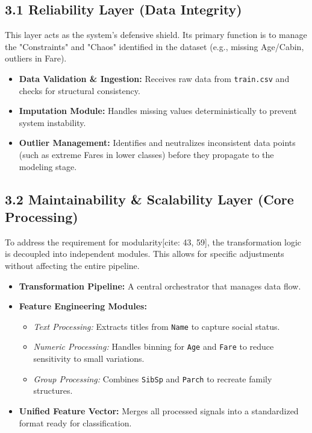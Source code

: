 \documentclass[12pt]{report}
\begin{document}
\subsection*{3.1 Reliability Layer (Data Integrity)}
This layer acts as the system's defensive shield. Its primary function is to manage the "Constraints" and "Chaos" identified in the dataset (e.g., missing Age/Cabin, outliers in Fare).
\begin{itemize}
    \item \textbf{Data Validation \& Ingestion:} Receives raw data from \texttt{train.csv} and checks for structural consistency.
    \item \textbf{Imputation Module:} Handles missing values deterministically to prevent system instability.
    \item \textbf{Outlier Management:} Identifies and neutralizes inconsistent data points (such as extreme Fares in lower classes) before they propagate to the modeling stage.
\end{itemize}

\subsection*{3.2 Maintainability \& Scalability Layer (Core Processing)}
To address the requirement for modularity[cite: 43, 59], the transformation logic is decoupled into independent modules. This allows for specific adjustments without affecting the entire pipeline.
\begin{itemize}
    \item \textbf{Transformation Pipeline:} A central orchestrator that manages data flow.
    \item \textbf{Feature Engineering Modules:}
    \begin{itemize}
        \item \textit{Text Processing:} Extracts titles from \texttt{Name} to capture social status.
        \item \textit{Numeric Processing:} Handles binning for \texttt{Age} and \texttt{Fare} to reduce sensitivity to small variations.
        \item \textit{Group Processing:} Combines \texttt{SibSp} and \texttt{Parch} to recreate family structures.
    \end{itemize}
    \item \textbf{Unified Feature Vector:} Merges all processed signals into a standardized format ready for classification.
\end{itemize}
\end{document}
